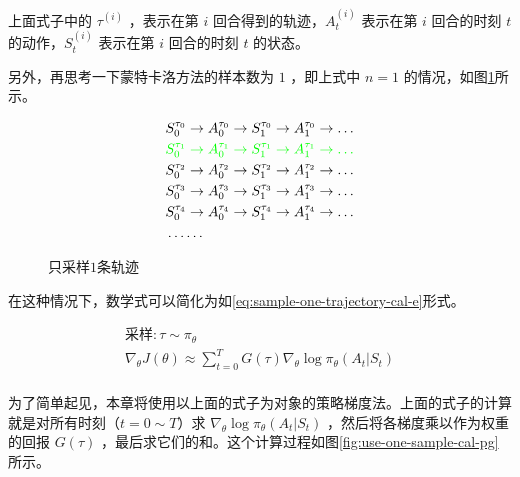 \documentclass[lang=cn,newtx,10pt,scheme=chinese]{elegantbook}
\begin{document}
上面式子中的 $\tau^{(i)}$ ，表示在第 $i$ 回合得到的轨迹，$A_t^{(i)}$ 表示在第 $i$ 回合的时刻 $t$ 的动作，$S_t^{(i)}$ 表示在第 $i$ 回合的时刻 $t$ 的状态。

另外，再思考一下蒙特卡洛方法的样本数为 $1$ ，即上式中 $n=1$ 的情况，如图\ref{fig:one-sample}所示。

\begin{figure}[!ht]
\centering
\begin{equation*}
\begin{aligned}
& S_0^{\tau_0} \rightarrow A_0^{\tau_0} \rightarrow S_1^{\tau_0} \rightarrow A_1^{\tau_0} \rightarrow \dots \\
& {\color{green} S_0^{\tau_1} \rightarrow A_0^{\tau_1} \rightarrow S_1^{\tau_1} \rightarrow A_1^{\tau_1} \rightarrow \dots} \\
& S_0^{\tau_2} \rightarrow A_0^{\tau_2} \rightarrow S_1^{\tau_2} \rightarrow A_1^{\tau_2} \rightarrow \dots \\
& S_0^{\tau_3} \rightarrow A_0^{\tau_3} \rightarrow S_1^{\tau_3} \rightarrow A_1^{\tau_3} \rightarrow \dots \\
& S_0^{\tau_4} \rightarrow A_0^{\tau_4} \rightarrow S_1^{\tau_4} \rightarrow A_1^{\tau_4} \rightarrow \dots \\
& \dots\dots
\end{aligned}
\end{equation*}
\caption{只采样$1$条轨迹}\label{fig:one-sample}
\end{figure}

在这种情况下，数学式可以简化为如\ref{eq:sample-one-trajectory-cal-e}形式。

\begin{equation}\label{eq:sample-one-trajectory-cal-e}
\begin{aligned}
\text{采样}: \tau\sim\pi_{\theta} \\
\nabla_{\theta}J(\theta) \approx \sum_{t=0}^TG(\tau)\nabla_{\theta}\log\pi_{\theta}(A_t|S_t) \\
\end{aligned}
\end{equation}

为了简单起见，本章将使用以上面的式子为对象的策略梯度法。上面的式子的计算就是对所有时刻（$t=0\sim T$）求 $\nabla_{\theta}\log\pi_{\theta}(A_t|S_t)$ ，然后将各梯度乘以作为权重的回报 $G(\tau)$ ，最后求它们的和。这个计算过程如图\ref{fig:use-one-sample-cal-pg}所示。
\end{document}
